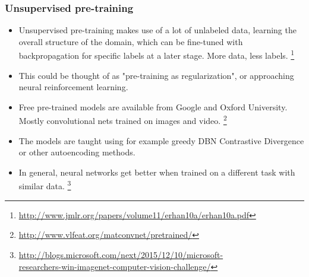 \documentclass[8pt]{beamer}
\begin{document}
\begin{frame}
\frametitle{Unsupervised pre-training}
 \begin{itemize}
  \item Unsupervised pre-training makes use of a lot of unlabeled data, learning the overall structure of the domain,
        which can be fine-tuned with backpropagation for specific labels at a later stage. More data, less labels.
        \footnote{\href{http://www.jmlr.org/papers/volume11/erhan10a/erhan10a.pdf}{http://www.jmlr.org/papers/volume11/erhan10a/erhan10a.pdf}}
  \item This could be thought of as "pre-training as regularization", or approaching neural reinforcement learning.
  \item Free pre-trained models are available from Google and Oxford University. Mostly convolutional nets trained on images and video.
        \footnote{\href{http://www.vlfeat.org/matconvnet/pretrained/}{http://www.vlfeat.org/matconvnet/pretrained/}}
  \item The models are taught using for example greedy DBN Contrastive Divergence or other autoencoding methods.
  \item In general, neural networks get better when trained on a different task with similar data.
        \footnote{\href{http://blogs.microsoft.com/next/2015/12/10/microsoft-researchers-win-imagenet-computer-vision-challenge/}
        {http://blogs.microsoft.com/next/2015/12/10/microsoft- \\ researchers-win-imagenet-computer-vision-challenge/}}
 \end{itemize}
\end{frame}
\end{document}
